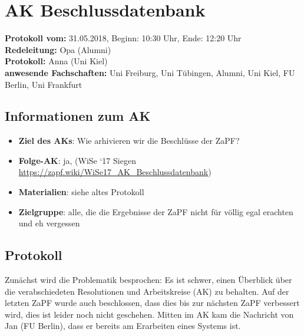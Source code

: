 
\section{AK Beschlussdatenbank}

	\textbf{Protokoll vom:} 31.05.2018,
	Beginn: 10:30 Uhr,
	Ende: 12:20 Uhr \\
	\textbf{Redeleitung:} Opa (Alumni) \\
	\textbf{Protokoll:} Anna (Uni Kiel) \\
	\textbf{anwesende Fachschaften:} Uni Freiburg, Uni Tübingen, Alumni, Uni Kiel, FU Berlin, Uni Frankfurt

	\subsection*{Informationen zum AK}
		\begin{itemize}
			\item \textbf{Ziel des AKs}: Wie arhivieren wir die Beschlüsse der ZaPF?
			\item \textbf{Folge-AK}: ja, (WiSe `17 Siegen \url{https://zapf.wiki/WiSe17_AK_Beschlussdatenbank})
      \item \textbf{Materialien}: siehe altes Protokoll
			\item \textbf{Zielgruppe}: alle, die die Ergebnisse der ZaPF nicht für völlig egal erachten und eh vergessen
		\end{itemize}

  \subsection*{Protokoll}
    Zunächst wird die Problematik besprochen: Es ist schwer, einen Überblick über die verabschiedeten Resolutionen und Arbeitskreise (AK) zu behalten. Auf der letzten ZaPF wurde auch beschlossen, dass dies bis zur nächsten ZaPF verbessert wird, dies ist leider noch nicht geschehen.
    Mitten im AK kam die Nachricht von Jan (FU Berlin), dass er bereits am Erarbeiten eines Systems ist.

